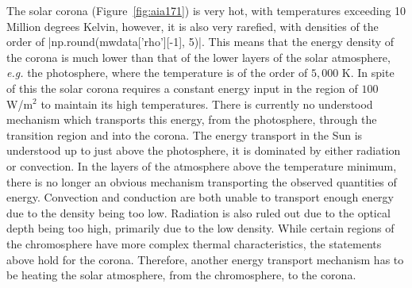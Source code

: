 The solar corona (Figure~\ref{fig:aia171}) is very hot, with temperatures exceeding 10 Million degrees Kelvin, however, it is also very rarefied, with densities of the order of \py[chapter1]|np.round(mwdata['rho'][-1], 5)|.
This means that the energy density of the corona is much lower than that of the lower layers of the solar atmosphere, \textit{e.g.} the photosphere, where the temperature is of the order of $5,000$ K.
In spite of this the solar corona requires a constant energy input in the region of $100$ W/m$^2$ to maintain its high temperatures.
There is currently no understood mechanism which transports this energy, from the photosphere, through the transition region and into the corona. %
The energy transport in the Sun is understood up to just above the photosphere, it is dominated by either radiation or convection.
In the layers of the atmosphere above the temperature minimum, there is no longer an obvious mechanism transporting the observed quantities of energy.
Convection and conduction are both unable to transport enough energy due to the density being too low.
Radiation is also ruled out due to the optical depth being too high, primarily due to the low density.
While certain regions of the chromosphere have more complex thermal characteristics, the statements above hold for the corona.
Therefore, another energy transport mechanism has to be heating the solar atmosphere, from the chromosphere, to the corona.



